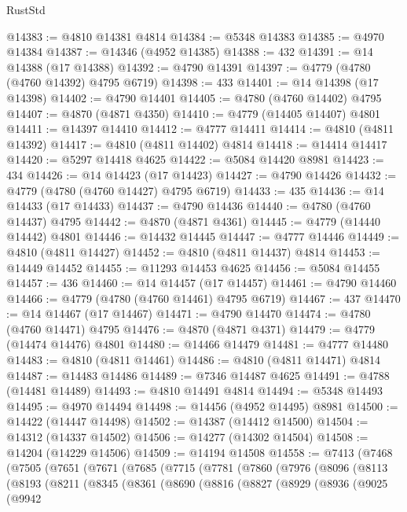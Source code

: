 \begin{lexlean}{RustStd}
\begin{coremodule}
@14383 := @4810 @14381 @4814
@14384 := @5348 @14383
@14385 := @4970 @14384
@14387 := @14346 (@4952 @14385)
@14388 := 432
@14391 := @14 @14388 (@17 @14388)
@14392 := @4790 @14391
@14397 := @4779 (@4780 (@4760 @14392) @4795 @6719)
@14398 := 433
@14401 := @14 @14398 (@17 @14398)
@14402 := @4790 @14401
@14405 := @4780 (@4760 @14402) @4795
@14407 := @4870 (@4871 @4350)
@14410 := @4779 (@14405 @14407) @4801
@14411 := @14397 @14410
@14412 := @4777 @14411
@14414 := @4810 (@4811 @14392)
@14417 := @4810 (@4811 @14402) @4814
@14418 := @14414 @14417
@14420 := @5297 @14418 @4625
@14422 := @5084 @14420 @8981
@14423 := 434
@14426 := @14 @14423 (@17 @14423)
@14427 := @4790 @14426
@14432 := @4779 (@4780 (@4760 @14427) @4795 @6719)
@14433 := 435
@14436 := @14 @14433 (@17 @14433)
@14437 := @4790 @14436
@14440 := @4780 (@4760 @14437) @4795
@14442 := @4870 (@4871 @4361)
@14445 := @4779 (@14440 @14442) @4801
@14446 := @14432 @14445
@14447 := @4777 @14446
@14449 := @4810 (@4811 @14427)
@14452 := @4810 (@4811 @14437) @4814
@14453 := @14449 @14452
@14455 := @11293 @14453 @4625
@14456 := @5084 @14455
@14457 := 436
@14460 := @14 @14457 (@17 @14457)
@14461 := @4790 @14460
@14466 := @4779 (@4780 (@4760 @14461) @4795 @6719)
@14467 := 437
@14470 := @14 @14467 (@17 @14467)
@14471 := @4790 @14470
@14474 := @4780 (@4760 @14471) @4795
@14476 := @4870 (@4871 @4371)
@14479 := @4779 (@14474 @14476) @4801
@14480 := @14466 @14479
@14481 := @4777 @14480
@14483 := @4810 (@4811 @14461)
@14486 := @4810 (@4811 @14471) @4814
@14487 := @14483 @14486
@14489 := @7346 @14487 @4625
@14491 := @4788 (@14481 @14489)
@14493 := @4810 @14491 @4814
@14494 := @5348 @14493
@14495 := @4970 @14494
@14498 := @14456 (@4952 @14495) @8981
@14500 := @14422 (@14447 @14498)
@14502 := @14387 (@14412 @14500)
@14504 := @14312 (@14337 @14502)
@14506 := @14277 (@14302 @14504)
@14508 := @14204 (@14229 @14506)
@14509 := @14194 @14508
@14558 := @7413
    (@7468
      (@7505
        (@7651
          (@7671
            (@7685
              (@7715
                (@7781
                  (@7860
                    (@7976
                      (@8096
                        (@8113
                          (@8193
                            (@8211
                              (@8345
                                (@8361
                                  (@8690
                                    (@8816
                                      (@8827
                                        (@8929
                                          (@8936
                                            (@9025
                                              (@9942

\end{coremodule}
\end{lexlean}
